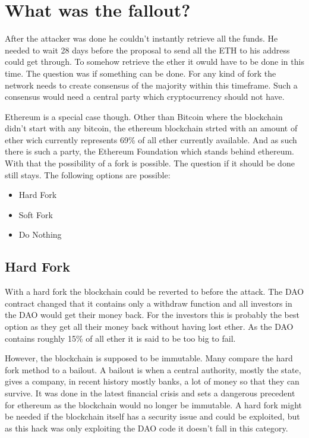 \documentclass[a4paper, 11pt]{scrartcl}
\begin{document}
\section{What was the fallout?}

After the attacker was done he couldn't instantly retrieve all the funds. He needed to wait 28 days before the proposal to send all the ETH to his address could get through. To somehow retrieve the ether it owuld have to be done in this time. The question was if something can be done. For any kind of fork the network needs to create consensus of the majority within this timeframe. Such a consensus would need a central party which cryptocurrency should not have. 

Ethereum is a special case though. Other than Bitcoin where the blockchain didn't start with any bitcoin, the ethereum blockchain strted with an amount of ether wich currently represents 69\% of all ether currently available. \cite{ethSupply} And as such there is such a party, the Ethereum Foundation which stands behind ethereum. \cite{eth} With that the possibility of a fork is possible. The question if it should be done still stays. The following options are possible:

\begin{itemize}
  \item Hard Fork
  \item Soft Fork
  \item Do Nothing
\end{itemize}

\subsection{Hard Fork}

With a hard fork the blockchain could be reverted to before the attack. The DAO contract changed that it contains only a withdraw function and all investors in the DAO would get their money back. For the investors this is probably the best option as they get all their money back without having lost ether. As the DAO contains roughly 15\% of all ether it is said to be too big to fail. \cite{understandingDAO}

However, the blockchain is supposed to be immutable. Many compare the hard fork method to a bailout. A bailout is when a central authority, mostly the state, gives a company, in recent history mostly banks, a lot of money so that they can survive. It was done in the latest financial crisis and sets a dangerous precedent for ethereum as the blockchain would no longer be immutable. A hard fork might be needed if the blockchain itself has a security issue and could be exploited, but as this hack was only exploiting the DAO code it doesn't fall in this category. \cite{understandingDAO}
\end{document}
